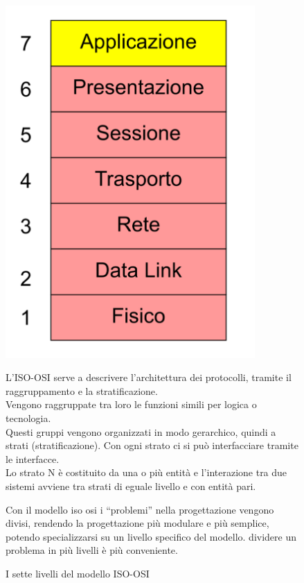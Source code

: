 \begin{figure}[h!]
    \begin{minipage}{0.45\textwidth}
        \centering
        \includegraphics[width=0.85\textwidth]{images/ISO_OSI_livelli.png}
        \caption{I sette livelli del modello ISO-OSI}
        \label{fig:iso_osi_livelli}
    \end{minipage}\hfill
    \begin{minipage}{0.5\textwidth}
        L'ISO-OSI serve a descrivere l'architettura dei protocolli, tramite il raggruppamento e la stratificazione.\\
        Vengono raggruppate tra loro le funzioni simili per logica o tecnologia.\\
        Questi gruppi vengono organizzati in modo gerarchico, quindi a strati (stratificazione). Con ogni strato ci si può interfacciare tramite le interfacce.\\
        Lo strato N è costituito da una o più entità e l'interazione tra due sistemi avviene tra strati di eguale livello e con entità pari.

        Con il modello iso osi i “problemi” nella progettazione vengono divisi, rendendo la progettazione più modulare e più semplice, potendo specializzarsi su un livello specifico del modello. dividere un problema in più livelli è più conveniente. 

\end{minipage}
\end{figure}
